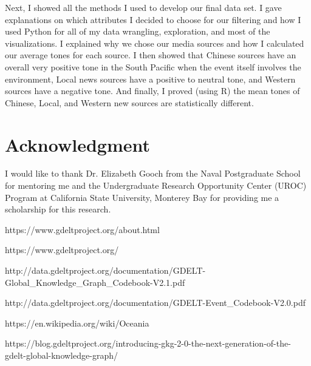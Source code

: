 \documentclass[12pt]{article}
\begin{document}
Next, I showed all the methods I used to develop our final data set. I gave explanations on which attributes I decided to choose for our filtering and how I used Python for all of my data wrangling, exploration, and most of the visualizations. I explained why we chose our media sources and how I calculated our average tones for each source. I then showed that Chinese sources have an overall very positive tone in the South Pacific when the event itself involves the environment, Local news sources have a positive to neutral tone, and Western sources have a negative tone. And finally, I proved (using R) the mean tones of Chinese, Local, and Western new sources are statistically different.

\section*{Acknowledgment}

I would like to thank Dr. Elizabeth Gooch from the Naval Postgraduate School for mentoring me and the Undergraduate Research Opportunity Center (UROC) Program at California State University, Monterey Bay for providing me a scholarship for this research.



\pagestyle{plain}

\begin{thebibliography}{}

https://www.gdeltproject.org/about.html

https://www.gdeltproject.org/ 

http://data.gdeltproject.org/documentation/GDELT-Global\_Knowledge\_Graph\_Codebook-V2.1.pdf

http://data.gdeltproject.org/documentation/GDELT-Event\_Codebook-V2.0.pdf

https://en.wikipedia.org/wiki/Oceania

https://blog.gdeltproject.org/introducing-gkg-2-0-the-next-generation-of-the-gdelt-global-knowledge-graph/

\end{thebibliography}
\end{document}
